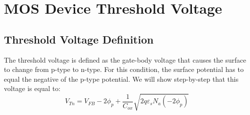 \section{MOS Device Threshold Voltage}
\subsection{Threshold Voltage Definition}
The threshold voltage is defined as the gate-body voltage that causes the surface to change from p-type to n-type.   For this condition, the surface potential has to equal the negative of the p-type potential.  We will show step-by-step that this voltage is equal to:
    \begin{equation}
        {V_{Tn}} = {V_{FB}} - 2{\phi _p} + \frac{1}{{{C_{ox}}}}\sqrt {2q{\varepsilon _s}{N_a}( - 2{\phi _p})} 
    \end{equation}
